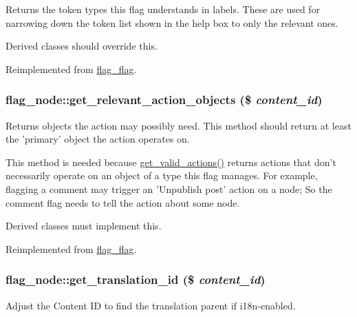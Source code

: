 Returns the token types this flag understands in labels. These are used for narrowing down the token list shown in the help box to only the relevant ones.

Derived classes should override this. 

Reimplemented from \hyperlink{classflag__flag_bc21f4a879072d1a9d36b352e9ac6be0}{flag\_\-flag}.\hypertarget{classflag__node_9578593ef74f207710a83242de8325f9}{
\subsubsection[{get\_\-relevant\_\-action\_\-objects}]{\setlength{\rightskip}{0pt plus 5cm}flag\_\-node::get\_\-relevant\_\-action\_\-objects (\$ {\em content\_\-id})}}
\label{classflag__node_9578593ef74f207710a83242de8325f9}


Returns objects the action may possibly need. This method should return at least the 'primary' object the action operates on.

This method is needed because \hyperlink{classflag__node_6bb9b8d25c34816cd3e7b5c11038374a}{get\_\-valid\_\-actions()} returns actions that don't necessarily operate on an object of a type this flag manages. For example, flagging a comment may trigger an 'Unpublish post' action on a node; So the comment flag needs to tell the action about some node.

Derived classes must implement this.

Reimplemented from \hyperlink{group__actions_g8f1b472c7f072dbfa682cc5b3fac9be6}{flag\_\-flag}.\hypertarget{classflag__node_c391b5c12fd0ad096dcbc50112923957}{
\subsubsection[{get\_\-translation\_\-id}]{\setlength{\rightskip}{0pt plus 5cm}flag\_\-node::get\_\-translation\_\-id (\$ {\em content\_\-id})}}
\label{classflag__node_c391b5c12fd0ad096dcbc50112923957}


Adjust the Content ID to find the translation parent if i18n-enabled.

